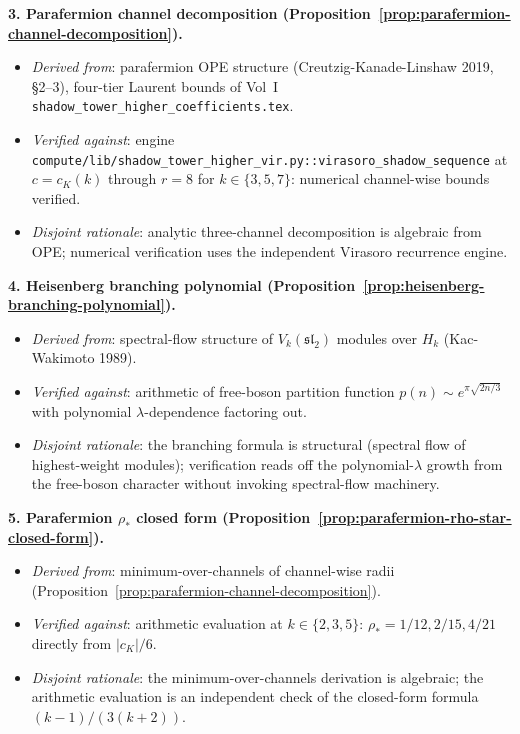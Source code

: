 \textbf{3. Parafermion channel decomposition
(Proposition~\ref{prop:parafermion-channel-decomposition}).}
\begin{itemize}[nosep]
\item \emph{Derived from}: parafermion OPE structure
 (Creutzig-Kanade-Linshaw 2019, \S 2--3), four-tier Laurent bounds
 of Vol~I \texttt{shadow\_tower\_higher\_coefficients.tex}.
\item \emph{Verified against}: engine
 \texttt{compute/lib/shadow\_tower\_higher\_vir.py::virasoro\_shadow\_sequence}
 at $c = c_K(k)$ through $r = 8$ for $k \in \{3, 5, 7\}$: numerical
 channel-wise bounds verified.
\item \emph{Disjoint rationale}: analytic three-channel decomposition
 is algebraic from OPE; numerical verification uses the independent
 Virasoro recurrence engine.
\end{itemize}

\textbf{4. Heisenberg branching polynomial
(Proposition~\ref{prop:heisenberg-branching-polynomial}).}
\begin{itemize}[nosep]
\item \emph{Derived from}: spectral-flow structure of
 $V_k(\mathfrak{sl}_2)$ modules over $H_k$ (Kac-Wakimoto 1989).
\item \emph{Verified against}: arithmetic of free-boson partition
 function $p(n) \sim e^{\pi \sqrt{2 n / 3}}$ with polynomial
 $\lambda$-dependence factoring out.
\item \emph{Disjoint rationale}: the branching formula is structural
 (spectral flow of highest-weight modules); verification reads off
 the polynomial-$\lambda$ growth from the free-boson character
 without invoking spectral-flow machinery.
\end{itemize}

\textbf{5. Parafermion $\rho_*$ closed form
(Proposition~\ref{prop:parafermion-rho-star-closed-form}).}
\begin{itemize}[nosep]
\item \emph{Derived from}: minimum-over-channels of channel-wise radii
 (Proposition~\ref{prop:parafermion-channel-decomposition}).
\item \emph{Verified against}: arithmetic evaluation at $k \in
 \{2, 3, 5\}$: $\rho_* = 1/12, 2/15, 4/21$ directly from
 $|c_K|/6$.
\item \emph{Disjoint rationale}: the minimum-over-channels
 derivation is algebraic; the arithmetic evaluation is an
 independent check of the closed-form formula
 $(k - 1)/(3(k + 2))$.
\end{itemize}

